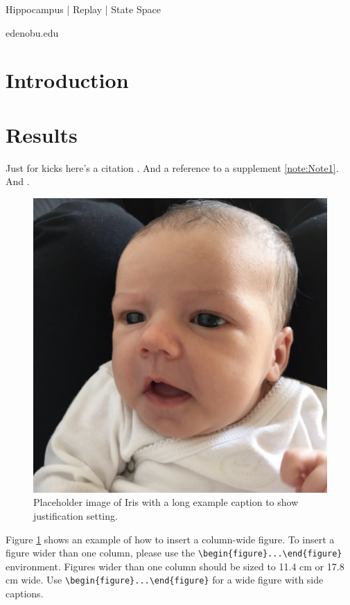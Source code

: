 \documentclass[times, twoside, watermark]{zHenriquesLab-StyleBioRxiv}
\begin{document}
\begin{keywords}
Hippocampus | Replay | State Space
\end{keywords}

\begin{corrauthor}
edeno\at bu.edu
\end{corrauthor}

\section*{Introduction}
\Blindtext

\section*{Results}

Just for kicks here's a citation \cite{Gustafsson2016}. And a reference to a supplement \cref{note:Note1}. And .
\Blindtext

\begin{figure}%
\centering
\includegraphics[width=.8\linewidth]{figures/Figure_1}
\caption{Placeholder image of Iris with a long example caption to show justification setting.}
\label{fig:computerNo}
\end{figure}

\Blindtext

Figure \ref{fig:computerNo} shows an example of how to insert a column-wide figure. To insert a figure wider than one column, please use the \verb|\begin{figure}...\end{figure}| environment. Figures wider than one column should be sized to 11.4 cm or 17.8 cm wide. Use \verb|\begin{figure}...\end{figure}| for a wide figure with side captions.
\end{document}

